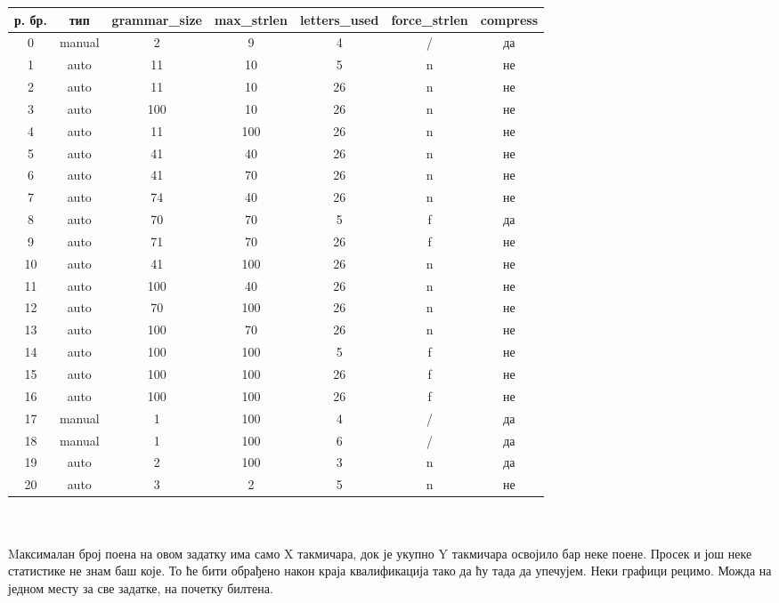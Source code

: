 \documentclass[a4wide]{article}
\begin{document}
\begin{tabular}{ c || c | c | c | c | c | c }
р. бр. & тип & grammar\_size & max\_strlen & letters\_used & force\_strlen & compress \\
\hline
0 & manual & 2 & 9 & 4 & / & да \\
1 & auto & 11 & 10 & 5 & n & не \\
2 & auto & 11 & 10 & 26 & n & не \\
3 & auto & 100 & 10 & 26 & n & не \\
4 & auto & 11 & 100 & 26 & n & не \\
5 & auto & 41 & 40 & 26 & n & не \\
6 & auto & 41 & 70 & 26 & n & не \\
7 & auto & 74 & 40 & 26 & n & не \\
8 & auto & 70 & 70 & 5 & f & да \\
9 & auto & 71 & 70 & 26 & f & не \\
10 & auto & 41 & 100 & 26 & n & не \\
11 & auto & 100 & 40 & 26 & n & не \\
12 & auto & 70 & 100 & 26 & n & не \\
13 & auto & 100 & 70 & 26 & n & не \\
14 & auto & 100 & 100 & 5 & f & не \\
15 & auto & 100 & 100 & 26 & f & не \\
16 & auto & 100 & 100 & 26 & f & не \\
17 & manual & 1 & 100 & 4 & / & да \\
18 & manual & 1 & 100 & 6 & / & да \\
19 & auto & 2 & 100 & 3 & n & да \\
20 & auto & 3 & 2 & 5 & n & не \\
\end{tabular}
\\
\linebreak
\linebreak
{}\\
\linebreak
\noindent [kasnije] Mаксималан број поена на овом задатку има само X такмичара, док је укупно Y такмичара освојило бар неке поене. Просек и још неке статистике не знам баш које. То ће бити обрађено након краја квалификација тако да ћу тада да упечујем. Неки графици рецимо. Можда на једном месту за све задатке, на почетку билтена.
\end{document}
